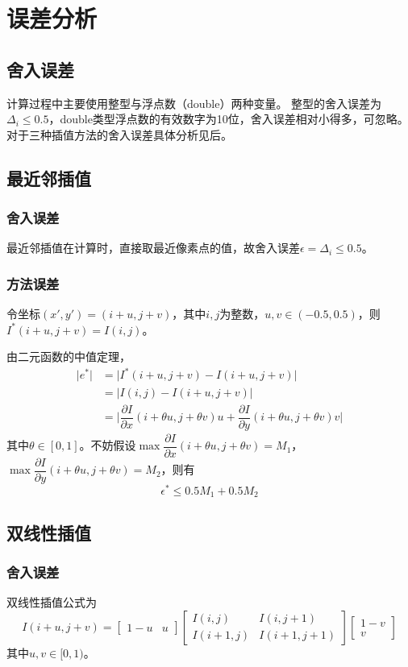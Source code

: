 \documentclass[11pt,a4paper]{ctexart}
\begin{document}
\section{误差分析}
\subsection{舍入误差}
计算过程中主要使用整型与浮点数（double）两种变量。
整型的舍入误差为$\Delta_i \le 0.5$，double类型浮点数的有效数字为10位，舍入误差相对小得多，可忽略。
对于三种插值方法的舍入误差具体分析见后。

\subsection{最近邻插值}
\subsubsection{舍入误差}
最近邻插值在计算时，直接取最近像素点的值，故舍入误差$\epsilon = \Delta_i \le 0.5$。

\subsubsection{方法误差}
令坐标$(x', y') = (i + u, j + v)$，其中$i, j$为整数，$u, v \in (-0.5, 0.5)$，则$I^*(i + u, j + v) = I(i, j)$。

由二元函数的中值定理，
\begin{align*}
\lvert e^*\rvert &= \lvert I^*(i + u, j + v) - I(i + u, j + v) \rvert\\
&= \lvert I(i, j) - I(i + u, j + v) \rvert \\
&= \lvert \dfrac{\partial I}{\partial x}(i + \theta u, j + \theta v) u + \dfrac{\partial I}{\partial y}(i + \theta u, j + \theta v) v \rvert
\end{align*}
其中$\theta \in [0, 1]$。不妨假设$\max \dfrac{\partial I}{\partial x}(i + \theta u, j + \theta v) = M_1$，$\max \dfrac{\partial I}{\partial y}(i + \theta u, j + \theta v) = M_2$，则有
$$\epsilon^* \le 0.5M_1 + 0.5M_2$$

\subsection{双线性插值}
\subsubsection{舍入误差}
双线性插值公式为
$$
I(i + u, j + v) = 
\begin{bmatrix}
    1-u & u
\end{bmatrix}
\begin{bmatrix}
    I(i, j) & I(i, j + 1) \\
    I(i + 1, j) & I(i + 1, j + 1)
\end{bmatrix}
\begin{bmatrix}
    1-v \\
    v
\end{bmatrix}
$$
其中$u, v \in [0, 1)$。
\end{document}

